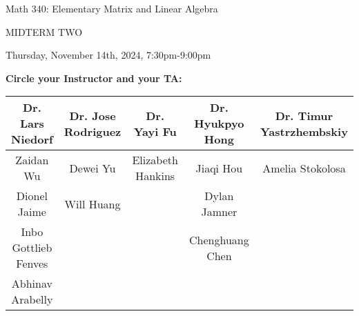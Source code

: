\documentclass[12pt]{extarticle}
\begin{document}
\LARGE{Math 340: Elementary Matrix and Linear Algebra}

\bigskip

\Huge{MIDTERM TWO} \normalsize

\bigskip

Thursday, November 14th, 2024, 7:30pm-9:00pm

\vspace{.12in}

\textbf{Circle your Instructor and your TA:}

\begin{table}[h]\centering \small
\begin{tabular}{|c|c|c|c|c|}
\hline
Dr. Lars Niedorf &  Dr. Jose Rodriguez & Dr. Yayi Fu & Dr. Hyukpyo Hong & Dr. Timur Yastrzhembskiy \\ \hline
Zaidan Wu & Dewei Yu & Elizabeth Hankins & Jiaqi Hou & Amelia Stokolosa \\ \hline
Dionel Jaime & Will Huang & & Dylan Jamner & \\ \hline
Inbo Gottlieb Fenves & & & Chenghuang Chen & \\ \hline
 Abhinav Arabelly & & & & \\ \hline
\end{tabular}
\end{table}





\vspace{-.3in}
\end{document}
